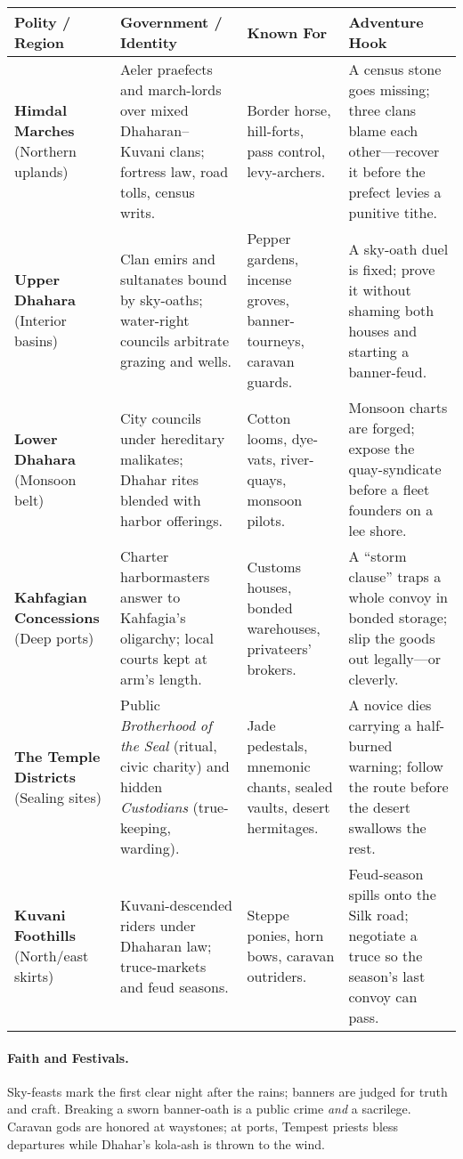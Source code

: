 \documentclass[11pt]{article}
\begin{document}
\begin{center}
\begin{tabular}{|p{3.4cm}|p{4.1cm}|p{4.2cm}|p{5.2cm}|}
\hline
\textbf{Polity / Region} & \textbf{Government / Identity} & \textbf{Known For} & \textbf{Adventure Hook} \\
\hline
\textbf{Himdal Marches} (Northern uplands) & Aeler praefects and march-lords over mixed Dhaharan--Kuvani clans; fortress law, road tolls, census writs. & Border horse, hill-forts, pass control, levy-archers. & A census stone goes missing; three clans blame each other—recover it before the prefect levies a punitive tithe. \\
\hline
\textbf{Upper Dhahara} (Interior basins) & Clan emirs and sultanates bound by sky-oaths; water-right councils arbitrate grazing and wells. & Pepper gardens, incense groves, banner-tourneys, caravan guards. & A sky-oath duel is fixed; prove it without shaming both houses and starting a banner-feud. \\
\hline
\textbf{Lower Dhahara} (Monsoon belt) & City councils under hereditary malikates; Dhahar rites blended with harbor offerings. & Cotton looms, dye-vats, river-quays, monsoon pilots. & Monsoon charts are forged; expose the quay-syndicate before a fleet founders on a lee shore. \\
\hline
\textbf{Kahfagian Concessions} (Deep ports) & Charter harbormasters answer to Kahfagia’s oligarchy; local courts kept at arm’s length. & Customs houses, bonded warehouses, privateers’ brokers. & A “storm clause” traps a whole convoy in bonded storage; slip the goods out legally—or cleverly. \\
\hline
\textbf{The Temple Districts} (Sealing sites) & Public \emph{Brotherhood of the Seal} (ritual, civic charity) and hidden \emph{Custodians} (true-keeping, warding). & Jade pedestals, mnemonic chants, sealed vaults, desert hermitages. & A novice dies carrying a half-burned warning; follow the route before the desert swallows the rest. \\
\hline
\textbf{Kuvani Foothills} (North/east skirts) & Kuvani-descended riders under Dhaharan law; truce-markets and feud seasons. & Steppe ponies, horn bows, caravan outriders. & Feud-season spills onto the Silk road; negotiate a truce so the season’s last convoy can pass. \\
\hline
\end{tabular}
\end{center}

\paragraph{Faith and Festivals.}
Sky-feasts mark the first clear night after the rains; banners are judged for truth and craft. Breaking a sworn banner-oath is a public crime \emph{and} a sacrilege. Caravan gods are honored at waystones; at ports, Tempest priests bless departures while Dhahar’s kola-ash is thrown to the wind.
\end{document}
